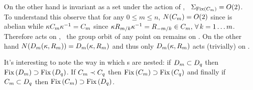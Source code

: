 \begin{example}
On the other hand  is invariant as a set under the action of , \ie\ $\Sigma_{\mathrm{Fix}\left(C_{m}\right)}=O(2)$.
To understand this observe that for any $0\le m\le n$, $N(C_{m})=O(2)$
since  is abelian while $\kappa C_{m} \kappa^{-1} = C_{m}$ since $\kappa R_{m/k}\kappa^{-1}=R_{-m/k}\in C_{m},\, \forall\, k=1\ldots m$. Therefore  acts on , \ie\ the group orbit of any point on  remains on .
On the other hand $N(D_{m}(\kappa,R_{m}))=D_{m}(\kappa,R_{m})$ and thus only $D_{m}(\kappa,R_{m})$ acts (trivially) on .

It's interesting to note the way in which \fixedsp s are nested: if $D_{m}\subset D_{q}$ then $\mathrm{Fix}\left(D_{m}\right)\supset\mathrm{Fix}\left(D_{q}\right)$. If $C_{m}\prec C_{q}$ then $\mathrm{Fix}\left(C_{m}\right)\supset\mathrm{Fix}\left(C_{q}\right)$ and
finally if $C_{m}\subset D_{q}$ then $\mathrm{Fix}\left(C_{m}\right)\supset\mathrm{Fix}\left(D_{q}\right)$.



\end{example}
